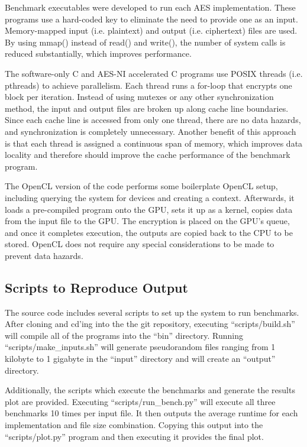 \documentclass[a4paper,10pt,conference]{IEEEtran}
\begin{document}
Benchmark executables were developed to run each AES implementation.  These programs use a hard-coded key to eliminate the need to provide one as an input.  Memory-mapped input (i.e. plaintext) and output (i.e. ciphertext) files are used.  By using mmap() instead of read() and write(), the number of system calls is reduced substantially, which improves performance.

The software-only C and AES-NI accelerated C programs use POSIX threads (i.e. pthreads) to achieve parallelism.  Each thread runs a for-loop that encrypts one block per iteration.  Instead of using mutexes or any other synchronization method, the input and output files are broken up along cache line boundaries.  Since each cache line is accessed from only one thread, there are no data hazards, and synchronization is completely unnecessary.  Another benefit of this approach is that each thread is assigned a continuous span of memory, which improves data locality and therefore should improve the cache performance of the benchmark program.

The OpenCL version of the code performs some boilerplate OpenCL setup, including querying the system for devices and creating a context.  Afterwards, it loads a pre-compiled program onto the GPU, sets it up as a kernel, copies data from the input file to the GPU.  The encryption is placed on the GPU's queue, and once it completes execution, the outputs are copied back to the CPU to be stored.  OpenCL does not require any special considerations to be made to prevent data hazards.

\subsection{Scripts to Reproduce Output}

The source code includes several scripts to set up the system to run benchmarks.  After cloning and cd'ing into the the git repository, executing ``scripts/build.sh'' will compile all of the programs into the ``bin'' directory. Running ``scripts/make\_inputs.sh'' will generate pseudorandom files ranging from 1 kilobyte to 1 gigabyte in the ``input'' directory and will create an ``output'' directory.

Additionally, the scripts which execute the benchmarks and generate the results plot are provided.  Executing ``scripts/run\_bench.py'' will execute all three benchmarks 10 times per input file.  It then outputs the average runtime for each implementation and file size combination.  Copying this output into the ``scripts/plot.py'' program and then executing it provides the final plot.
\end{document}
